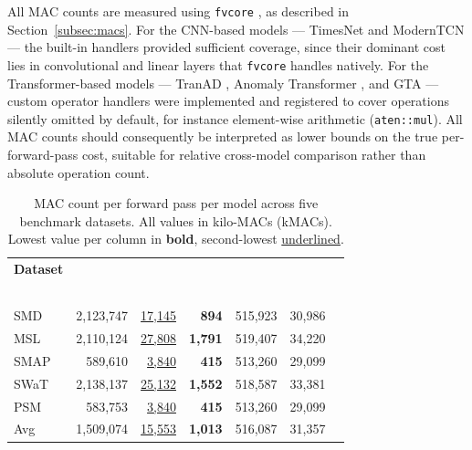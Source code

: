 \documentclass[twoside,11pt,openright]{report}
\begin{document}
All MAC counts are measured using \texttt{fvcore} \citep{fvcore}, as described in
Section~\ref{subsec:macs}. For the CNN-based models --- TimesNet
\citep{timesnet2023} and ModernTCN \citep{moderntcn2024} --- the built-in handlers
provided sufficient coverage, since their dominant cost lies in convolutional and
linear layers that \texttt{fvcore} handles natively. For the Transformer-based
models --- TranAD \citep{tranad2022}, Anomaly Transformer
\citep{anomalytransformer2022}, and GTA \citep{gta2022} --- custom operator handlers
were implemented and registered to cover operations silently omitted by default,
for instance element-wise arithmetic (\texttt{aten::mul}). All MAC counts
should consequently be interpreted as lower bounds on the true per-forward-pass
cost, suitable for relative cross-model comparison rather than absolute operation count.

\begin{table}[ht]
\centering
\caption{MAC count per forward pass per model across five benchmark datasets.
All values in kilo-MACs (kMACs). Lowest value per column in \textbf{bold}, second-lowest
\underline{underlined}.}
\label{tab:mac_counts}
\begin{tabular}{l rrrrr r}
\toprule
\textbf{Dataset}
    & \thead{\textbf{TimesNet}\\\citep{timesnet2023}}
    & \thead{\textbf{ModernTCN}\\\citep{moderntcn2024}}
    & \thead{\textbf{TranAD}\\\citep{tranad2022}}
    & \thead{\textbf{AnomTr.}\\\citep{anomalytransformer2022}}
    & \thead{\textbf{GTA}\\\citep{gta2022}} \\
\midrule
SMD  & 2{,}123{,}747 & \underline{17{,}145} & \textbf{894}   & 515{,}923 & 30{,}986 \\
MSL  & 2{,}110{,}124 & \underline{27{,}808} & \textbf{1{,}791} & 519{,}407 & 34{,}220 \\
SMAP &   589{,}610   &  \underline{3{,}840} & \textbf{415}   & 513{,}260 & 29{,}099 \\
SWaT & 2{,}138{,}137 & \underline{25{,}132} & \textbf{1{,}552} & 518{,}587 & 33{,}381 \\
PSM  &   583{,}753   &  \underline{3{,}840} & \textbf{415}   & 513{,}260 & 29{,}099 \\
\midrule
Avg  & 1{,}509{,}074 & \underline{15{,}553} & \textbf{1{,}013} & 516{,}087 & 31{,}357 \\
\bottomrule
\end{tabular}
\end{table}
\end{document}
